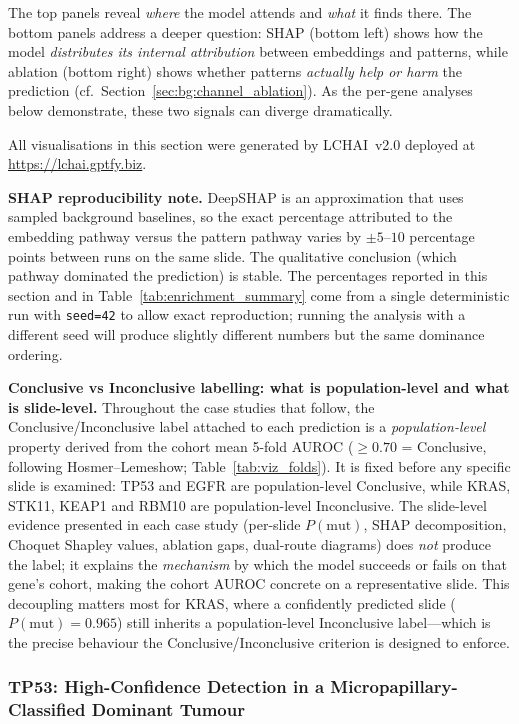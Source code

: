 The top panels reveal \emph{where} the model attends and \emph{what}
it finds there.
The bottom panels address a deeper question: SHAP (bottom left) shows
how the model \emph{distributes its internal attribution} between
embeddings and patterns, while ablation (bottom right) shows whether
patterns \emph{actually help or harm} the prediction
(cf.\ Section~\ref{sec:bg:channel_ablation}).
As the per-gene analyses below demonstrate, these two signals can
diverge dramatically.

All visualisations in this section were generated by LCHAI~v2.0
deployed at \url{https://lchai.gptfy.biz}.

\textbf{SHAP reproducibility note.}
DeepSHAP is an approximation that uses sampled background baselines,
so the exact percentage attributed to the embedding pathway versus
the pattern pathway varies by $\pm 5$--$10$ percentage points
between runs on the same slide.
The qualitative conclusion (which pathway dominated the prediction)
is stable.
The percentages reported in this section and in
Table~\ref{tab:enrichment_summary} come from a single deterministic
run with \texttt{seed=42} to allow exact reproduction; running the
analysis with a different seed will produce slightly different
numbers but the same dominance ordering.

\textbf{Conclusive vs Inconclusive labelling: what is
population-level and what is slide-level.}
Throughout the case studies that follow, the
Conclusive/Inconclusive label attached to each prediction is a
\emph{population-level} property derived from the cohort mean 5-fold
AUROC ($\geq 0.70$ = Conclusive, following Hosmer--Lemeshow;
Table~\ref{tab:viz_folds}).
It is fixed before any specific slide is examined: TP53 and EGFR
are population-level Conclusive, while KRAS, STK11, KEAP1 and RBM10 are
population-level Inconclusive.
The slide-level evidence presented in each case study (per-slide
$P(\text{mut})$, SHAP decomposition, Choquet Shapley values,
ablation gaps, dual-route diagrams) does \emph{not} produce the
label; it explains the \emph{mechanism} by which the model
succeeds or fails on that gene's cohort, making the cohort AUROC
concrete on a representative slide.
This decoupling matters most for KRAS, where a confidently
predicted slide ($P(\text{mut}) = 0.965$) still inherits a
population-level Inconclusive label---which is the precise behaviour
the Conclusive/Inconclusive criterion is designed to enforce.


\subsubsection{TP53: High-Confidence Detection in a
Micropapillary-Classified Dominant Tumour}
\label{sec:eval:tcga:tp53}

